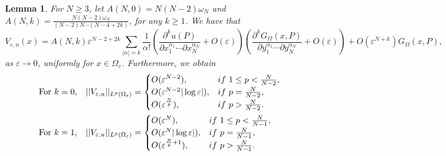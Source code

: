 \documentclass[10pt,a4paper]{amsart}
\newtheorem{lemma}{Lemma}
\newcommand{\Ma}{\color{blue}}
\renewcommand\O\Omega
\newcommand{\Ying}{\color{red}}
\newcommand\e\varepsilon
\begin{document}
\begin{lemma}\label{l:improvedL2Ve}
 For $N\ge 3$, let 	$A(N,0)=N(N-2)\omega_N$ and 
			$A(N,k)=\frac{N(N-2)\omega_N}{(N-2)N\cdots(N-4+2k)}$, for any $k\ge1$. 
			We have that
				\begin{equation}\label{V1}
				\!\!\!\!\!\!\!\!\!\!\!\!V_{\e,u}(x)=A(N,k)\e^{N-2+2k}
					\sum_{|\alpha|=k}\frac1{\alpha!}
					\left(\frac{\partial^ku(P)}{\partial x_1^{\alpha_1}\cdots\partial x_N^{\alpha_N}}+O(\e)\right)
					\left(\frac{\partial^kG_{\Omega}(x,P)}{\partial y_1^{\alpha_1}\cdots\partial y_N^{\alpha_N}}+O(\e)\right)+O(\e^{N+k})G_{\Omega}(x,P),
				\end{equation}
			as $\e\to0$,	uniformly for $x\in\O_\e$.
			Furthermore, we obtain
			\begin{equation}\label{V3}
				\begin{aligned}
				&\hbox{For $k=0$,}\quad
					||V_{\e,u}||_{L^p(\O_\e)}=
					\begin{cases}
					\displaystyle	O(\e^{N-2}),  &if\ 1\le p<\frac N{N-2},\\
						O(\e^{N-2}|\log\e|), &if\  p=\frac{N}{N-2},\\
						O(\e^{\frac{N}{p}}),   &if\  p>\frac{N}{N-2}.\\
					\end{cases}\\
				&\hbox{For $k=1$,}\quad
					||V_{\e,u}||_{L^p(\O_\e)}=
					\begin{cases}
						O(\e^{N}),  &if\ 1\le p<\frac N{N-1},\\
						O(\e^{N}|\log\e|), &if\  p=\frac{N}{N-1},\\
						O(\e^{\frac{N}{p}+1}),   &if\  p>\frac{N}{N-1}.\\

\end{cases}
\end{aligned}
\end{equation}
\end{lemma}
\end{document}
